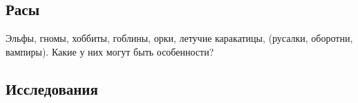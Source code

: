 \documentclass[a4paper,12pt]{article}
\begin{document}
    \subsection{Расы}

      Эльфы, гномы, хоббиты, гоблины, орки, летучие каракатицы, (русалки, оборотни, вампиры). Какие у них могут быть особенности?

    \subsection{Исследования}
\end{document}

